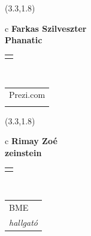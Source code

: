 \documentclass[11pt]{article}
\begin{document}
\makebox(3.3,1.8){
  \renewcommand\arraystretch{1.3}
  \begin{tabular}[c]{c}
    \hspace{8.5mm}
    \LARGE\bf{ Farkas Szilveszter }\\
    \hspace{8.5mm}
    \Large{ Phanatic }\\
    \renewcommand\arraystretch{3}
    \begin{tabular}[c]{c}
      \centering
      \fontfamily{phv}\selectfont{
        \textbf{
          \textsc{
            \scriptsize{
            \color{Dark}{ Ismerkedő }\color{Dark}{ Webmester }\color{Bright}{ Sminkmester }\color{Bright}{ Programozó }
            }
          }
        }
      }
    \end{tabular}
    \\
    \renewcommand\arraystretch{1}
    \begin{tabular}{p{3.3in}}
      \hspace{.7cm}Prezi.com\\
      \hspace{.7cm}\emph{  }\\
    \end{tabular}
  \end{tabular}
}

\makebox(3.3,1.8){
  \renewcommand\arraystretch{1.3}
  \begin{tabular}[c]{c}
    \hspace{8.5mm}
    \LARGE\bf{ Rimay Zoé }\\
    \hspace{8.5mm}
    \Large{ zeinstein }\\
    \renewcommand\arraystretch{3}
    \begin{tabular}[c]{c}
      \centering
      \fontfamily{phv}\selectfont{
        \textbf{
          \textsc{
            \scriptsize{
            \color{Dark}{ Ismerkedő }\color{Bright}{ Webmester }\color{Bright}{ Sminkmester }\color{Bright}{ Programozó }
            }
          }
        }
      }
    \end{tabular}
    \\
    \renewcommand\arraystretch{1}
    \begin{tabular}{p{3.3in}}
      \hspace{.7cm}BME\\
      \hspace{.7cm}\emph{ hallgató }\\
    \end{tabular}
  \end{tabular}
}
\end{document}
